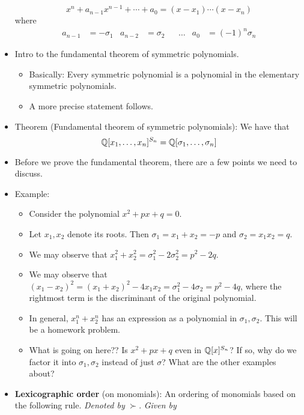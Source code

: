 \documentclass[../notes.tex]{subfiles}
\begin{document}
\begin{itemize}
    \begin{equation*}
        x^n+a_{n-1}x^{n-1}+\cdots+a_0 = (x-x_1)\cdots(x-x_n)
    \end{equation*}
    where
    \begin{align*}
        a_{n-1} &= -\sigma_1&
        a_{n-2} &= \sigma_2&
        &\dots&
        a_0 &= (-1)^n\sigma_n
    \end{align*}
    \item Intro to the fundamental theorem of symmetric polynomials.
    \begin{itemize}
        \item Basically: Every symmetric polynomial is a polynomial in the elementary symmetric polynomials.
        \item A more precise statement follows.
    \end{itemize}
    \item Theorem (Fundamental theorem of symmetric polynomials): We have that
    \begin{equation*}
        \mathbb{Q}[x_1,\dots,x_n]^{S_n} = \mathbb{Q}[\sigma_1,\dots,\sigma_n]
    \end{equation*}
    \item Before we prove the fundamental theorem, there are a few points we need to discuss.
    \item Example:
    \begin{itemize}
        \item Consider the polynomial $x^2+px+q=0$.
        \item Let $x_1,x_2$ denote its roots. Then $\sigma_1=x_1+x_2=-p$ and $\sigma_2=x_1x_2=q$.
        \item We may observe that $x_1^2+x_2^2=\sigma_1^2-2\sigma_2^2=p^2-2q$.
        \item We may observe that $(x_1-x_2)^2=(x_1+x_2)^2-4x_1x_2=\sigma_1^2-4\sigma_2=p^2-4q$, where the rightmost term is the discriminant of the original polynomial.
        \item In general, $x_1^n+x_2^n$ has an expression as a polynomial in $\sigma_1,\sigma_2$. This will be a homework problem.
        \item What is going on here?? Is $x^2+px+q$ even in $\mathbb{Q}[x]^{S_n}$? If so, why do we factor it into $\sigma_1,\sigma_2$ instead of just $\sigma$? What are the other examples about?
    \end{itemize}
    \item \textbf{Lexicographic order} (on monomials): An ordering of monomials based on the following rule. \emph{Denoted by} $\bm{\succ}$. \emph{Given by}\par

\end{itemize}
\end{document}
